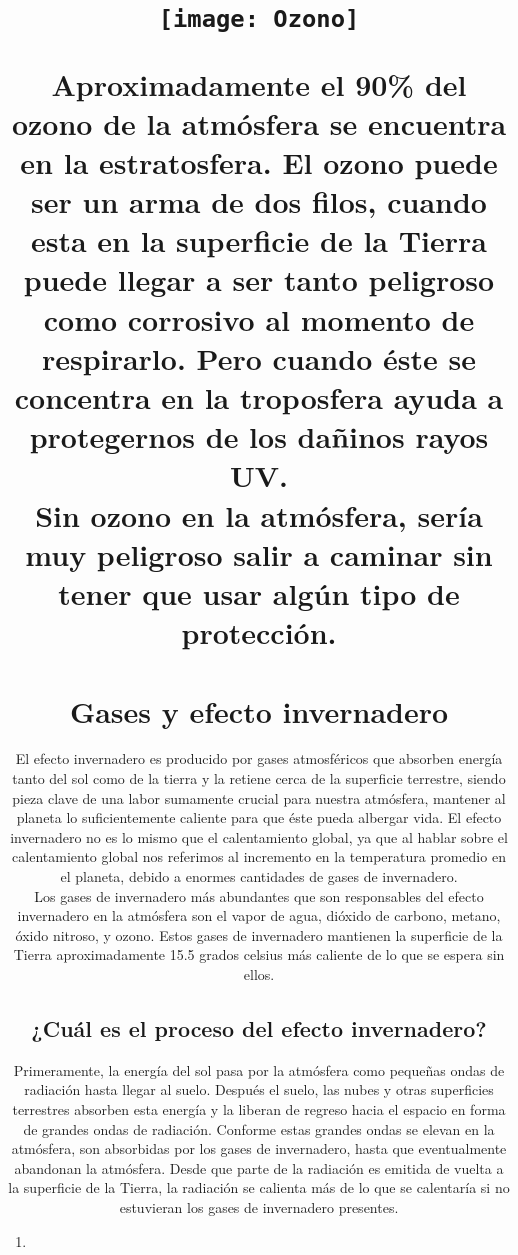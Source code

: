 \documentclass{article}
\begin{document}
{\title{\begin{figure}[H]
\texttt{[image: Ozono]}
\centering
\end{figure}
Aproximadamente el 90\% del ozono de la atmósfera se encuentra en la estratosfera. El ozono puede ser un arma de dos filos, cuando esta en la superficie de la Tierra puede llegar a ser tanto peligroso como corrosivo al momento de respirarlo. Pero cuando éste se concentra en la troposfera ayuda a protegernos de los dañinos rayos UV. \\
Sin ozono en la atmósfera, sería muy peligroso salir a caminar sin tener que usar algún tipo de protección.

\section{Gases y efecto invernadero}
El efecto invernadero es producido por gases atmosféricos que absorben energía tanto del sol como de la tierra y la retiene cerca de la superficie terrestre, siendo pieza clave de una labor sumamente crucial para nuestra atmósfera, mantener al planeta lo suficientemente caliente para que éste pueda albergar vida. El efecto invernadero no es lo mismo que el calentamiento global, ya que al hablar sobre el calentamiento global nos referimos al incremento en la temperatura promedio en el planeta, debido a enormes cantidades de gases de invernadero.\\
Los gases de invernadero más abundantes que son responsables del efecto invernadero en la atmósfera son el vapor de agua, dióxido de carbono, metano, óxido nitroso, y ozono. Estos gases de invernadero mantienen la superficie de la Tierra aproximadamente 15.5 grados celsius más caliente de lo que se espera sin ellos.

\subsection{¿Cuál es el proceso del efecto invernadero?}
Primeramente, la energía del sol pasa por la atmósfera como pequeñas ondas de radiación hasta llegar al suelo. Después el suelo, las nubes y otras superficies terrestres absorben esta energía y la liberan de regreso hacia el espacio en forma de grandes ondas de radiación. Conforme estas grandes ondas se elevan en la atmósfera, son absorbidas por los gases de invernadero, hasta que eventualmente abandonan la atmósfera. Desde que parte de la radiación es emitida de vuelta a la superficie de la Tierra, la radiación se calienta más de lo que se calentaría si no estuvieran los gases de invernadero presentes.\\
\begin{enumerate}
\item 
\end{enumerate}

}}
\end{document}
